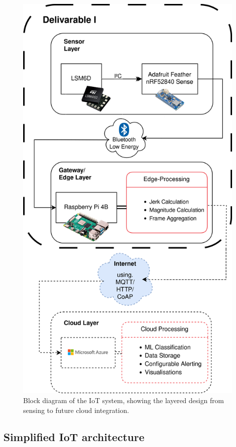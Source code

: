 \documentclass[conference]{IEEEtran}
\begin{document}
\begin{figure}[h]
	\centering
	\includegraphics[width=0.9\columnwidth]{media/basic_architecture_overview.png}
	\caption{Block diagram of the IoT system, showing the layered design from sensing to future cloud integration.}
	\label{fig:block_diagram}
\end{figure}


\subsection{Simplified IoT architecture}
\end{document}
